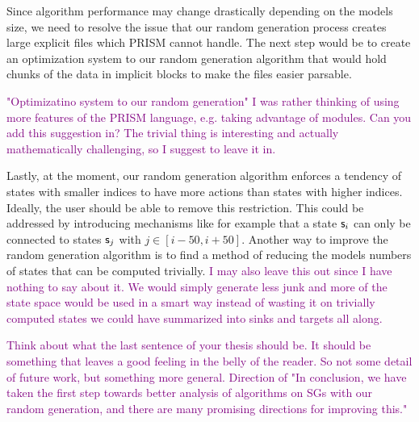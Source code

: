 Since algorithm performance may change drastically depending on the models size,
we need to resolve the issue that our random generation process creates large explicit files which PRISM cannot handle.
The next step would be to create an optimization system to our random generation algorithm that would hold chunks of the data in 
implicit blocks to make the files easier parsable.

\textcolor{purple}{"Optimizatino system to our random generation" I was rather thinking of using more features of the PRISM language, e.g. taking advantage of modules. Can you add this suggestion in?}
\textcolor{purple}{The trivial thing is interesting and actually mathematically challenging, so I suggest to leave it in.}

Lastly, at the moment, our random generation algorithm enforces a tendency of states with smaller indices to have more actions than states with higher indices.
Ideally, the user should be able to remove this restriction.
This could be addressed by introducing mechanisms like for example that a state $\mathsf{s}_i$ can only be connected to states $\mathsf{s}_{j}$ with $j \in [i-50, i+50]$.
Another way to improve the random generation algorithm is to find a method of reducing the models numbers of states that can be computed trivially.
\textcolor{purple}{I may also leave this out since I have nothing to say about it. We would simply generate less junk and more of the state space
would be used in a smart way instead of wasting it on trivially computed states we could have summarized into sinks and targets all along.} 

\textcolor{purple}{Think about what the last sentence of your thesis should be. It should be something that leaves a good feeling in the belly of the reader. So not some detail of future work, but something more general.
Direction of "In conclusion, we have taken the first step towards better analysis of algorithms on SGs with our random generation, and there are many promising directions for improving this."
}